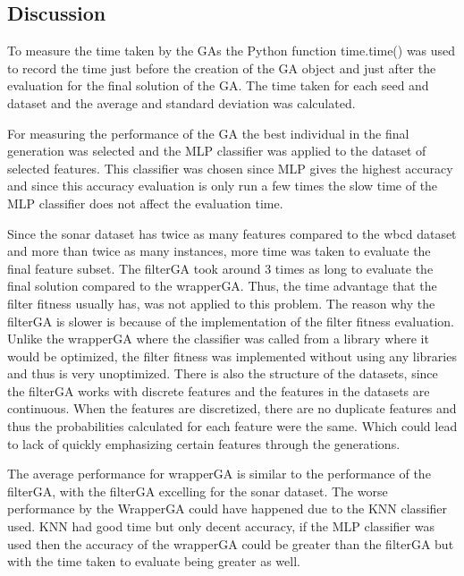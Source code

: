 \documentclass{article}
\begin{document}
\subsection*{Discussion}
To measure the time taken by the GAs the Python function time.time() was used to record the time just before the creation of the GA object and just after the evaluation for the final solution of the GA. The time taken for each seed and dataset and the average and standard deviation was calculated. \par
\noindent For measuring the performance of the GA the best individual in the final generation was selected and the MLP classifier was applied to the dataset of selected features. This classifier was chosen since MLP gives the highest accuracy and since this accuracy evaluation is only run a few times the slow time of the MLP classifier does not affect the evaluation time. 
\begin{center}
\end{center}
Since the sonar dataset has twice as many features compared to the wbcd dataset and more than twice as many instances, more time was taken to evaluate the final feature subset. The filterGA took around 3 times as long to evaluate the final solution compared to the wrapperGA. Thus, the time advantage that the filter fitness usually has, was not applied to this problem. The reason why the filterGA is slower is because of the implementation of the filter fitness evaluation. Unlike the wrapperGA where the classifier was called from a library where it would be optimized, the filter fitness was implemented without using any libraries and thus is very unoptimized. There is also the structure of the datasets, since the filterGA works with discrete features and the features in the datasets are continuous. When the features are discretized, there are no duplicate features and thus the probabilities calculated for each feature were the same. Which could lead to lack of quickly emphasizing certain features through the generations. \par
\noindent The average performance for wrapperGA is similar to the performance of the filterGA, with the filterGA excelling for the sonar dataset. The worse performance by the WrapperGA could have happened due to the KNN classifier used. KNN had good time but only decent accuracy, if the MLP classifier was used then the accuracy of the wrapperGA could be greater than the filterGA but with the time taken to evaluate being greater as well. \par
\end{document}
